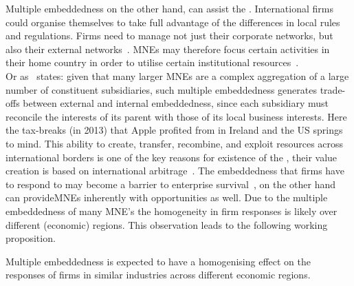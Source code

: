 Multiple embeddedness on the other hand, can assist the \mne.
International firms could organise themselves to take full advantage of the differences in local rules and regulations.
Firms need to manage not just their corporate networks, but also their external networks~\citep{Meyer:2011vt}. 
MNEs may therefore focus certain activities in their home country in order to utilise certain institutional resources~\citep{Jackson:2008cz}.\\
Or as~\citep{Meyer:2011vt} states: given that many larger MNEs are a complex aggregation of a large number of constituent subsidiaries, such multiple embeddedness generates trade-offs between external and internal embeddedness, since each subsidiary must reconcile the interests of its parent with those of its local business interests.
Here the tax-breaks (in 2013) that Apple profited from in Ireland and the US springs to mind.
This ability to create, transfer, recombine, and exploit resources across international borders is one of the key reasons for existence of the \mne, their value creation is based on international arbitrage~\citep{Meyer:2011vt}.
The embeddedness that firms have to respond to may become a barrier to enterprise survival~\citep{Newman:2000fc}, on the other hand \me can provide\glspl{MNE} inherently with opportunities as well.
Due to the multiple embeddedness of many MNE's the homogeneity in firm responses is likely over different (economic) regions. 
This observation leads to the following working proposition.


\begin{WP}
Multiple embeddedness is expected to have a homogenising effect on the responses of firms in similar industries across different economic regions. 
\end{WP}





